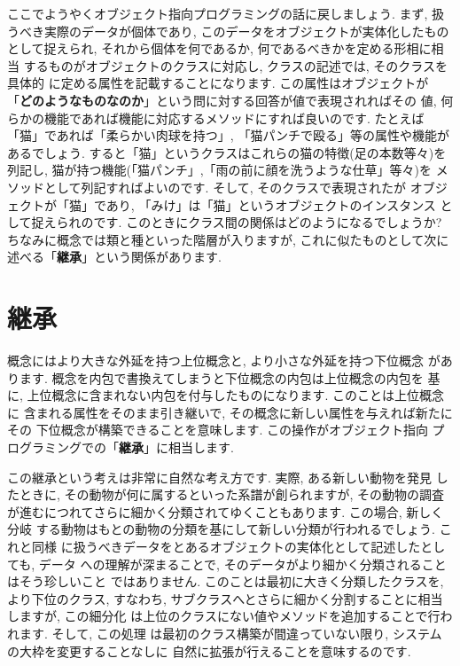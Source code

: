 ここでようやくオブジェクト指向プログラミングの話に戻しましょう. まず,
 扱うべき実際のデータが個体であり, このデータをオブジェクトが実体化したもの
として捉えられ, それから個体を何であるか, 何であるべきかを定める形相に相当
するものがオブジェクトのクラスに対応し, クラスの記述では, そのクラスを具体的
に定める属性を記載することになります. この属性はオブジェクトが
「\textbf{どのようなものなのか}」という問に対する回答が値で表現されればその
値,  何らかの機能であれば機能に対応するメソッドにすれば良いのです. たとえば
「猫」であれば「柔らかい肉球を持つ」, 「猫パンチで殴る」等の属性や機能が
あるでしょう. すると「猫」というクラスはこれらの猫の特徴(足の本数等々)を
列記し, 猫が持つ機能(「猫パンチ」,「雨の前に顔を洗うような仕草」等々)を
メソッドとして列記すればよいのです. そして, そのクラスで表現されたが
オブジェクトが「猫」であり, 「みけ」は「猫」というオブジェクトのインスタンス
として捉えられのです. このときにクラス間の関係はどのようになるでしょうか?
 ちなみに概念では類と種といった階層が入りますが, これに似たものとして次に
述べる「\textbf{継承}」という関係があります.


\section{継承}


概念にはより大きな外延を持つ上位概念と, より小さな外延を持つ下位概念
があります. 概念を内包で書換えてしまうと下位概念の内包は上位概念の内包を
基に, 上位概念に含まれない内包を付与したものになります. このことは上位概念に
含まれる属性をそのまま引き継いで, その概念に新しい属性を与えれば新たにその
下位概念が構築できることを意味します. この操作がオブジェクト指向
プログラミングでの「\textbf{継承}」に相当します.
\newline


この継承という考えは非常に自然な考え方です. 実際, ある新しい動物を発見
したときに, その動物が何に属するといった系譜が創られますが, その動物の調査
が進むにつれてさらに細かく分類されてゆくこともあります. この場合, 新しく分岐
する動物はもとの動物の分類を基にして新しい分類が行われるでしょう. これと同様
に扱うべきデータをとあるオブジェクトの実体化として記述したとしても, データ
への理解が深まることで, そのデータがより細かく分類されることはそう珍しいこと
ではありません. このことは最初に大きく分類したクラスを, より下位のクラス,
 すなわち, サブクラスへとさらに細かく分割することに相当しますが, この細分化
は上位のクラスにない値やメソッドを追加することで行われます. そして, この処理
は最初のクラス構築が間違っていない限り, システムの大枠を変更することなしに
自然に拡張が行えることを意味するのです.
\newline


